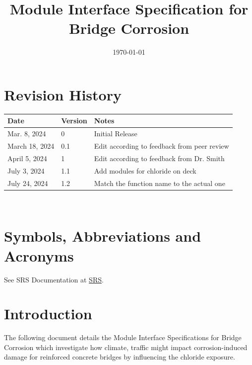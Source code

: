 \documentclass[12pt, titlepage]{article}
\begin{document}
\title{Module Interface Specification for Bridge Corrosion}

\author{\authname}

\date{\today}

\maketitle


\section{Revision History}

\begin{tabularx}{\textwidth}{p{3cm}p{2cm}X}
\toprule {\bf Date} & {\bf Version} & {\bf Notes}\\
\midrule
Mar. 8, 2024 & 0 & Initial Release\\
March 18, 2024 & 0.1 & Edit according to feedback from peer review \\
April 5, 2024 & 1 & Edit according to feedback from Dr. Smith\\
July 3, 2024 & 1.1 & Add modules for chloride on deck\\
July 24, 2024 & 1.2 & Match the function name to the actual one \\
\bottomrule
\end{tabularx}

~\newpage

\section{Symbols, Abbreviations and Acronyms}

See SRS Documentation at \href{https://github.com/CynthiaLiu0805/BridgeCorrosion/blob/main/docs/SRS/SRS.pdf}{SRS}.


\newpage

\tableofcontents

\newpage


\section{Introduction}

The following document details the Module Interface Specifications for Bridge Corrosion which investigate how climate, traffic might impact corrosion-induced
damage for reinforced concrete bridges by influencing the chloride exposure.
\end{document}
